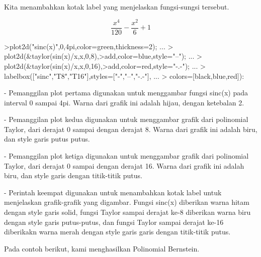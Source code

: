 \documentclass[a4paper,10pt]{article}
\begin{document}
\begin{eulernotebook}
\begin{eulercomment}
\begin{eulercomment}
\begin{eulercomment}
\begin{eulercomment}
\begin{eulercomment}
Kita menambahkan kotak label yang menjelaskan fungsi-sungsi tersebut.
\end{eulercomment}
\begin{eulerformula}
\[
\frac{x^4}{120}-\frac{x^2}{6}+1
\]
\end{eulerformula}
\begin{eulerprompt}
>plot2d("sinc(x)",0,4pi,color=green,thickness=2); ...
>  plot2d(&taylor(sin(x)/x,x,0,8),>add,color=blue,style="--"); ...
>  plot2d(&taylor(sin(x)/x,x,0,16),>add,color=red,style="-.-"); ...
>  labelbox(["sinc","T8","T16"],styles=["-","--","-.-"], ...
>    colors=[black,blue,red]):
\end{eulerprompt}
\begin{eulercomment}
- Pemanggilan plot pertama digunakan untuk menggambar fungsi sinc(x)
pada interval 0 sampai 4pi. Warna dari grafik ini adalah hijau, dengan
ketebalan 2.

- Pemanggilan plot kedua digunakan untuk menggambar grafik dari
polinomial Taylor, dari derajat 0 sampai dengan derajat 8. Warna dari
grafik ini adalah biru, dan style garis putus putus.

- Pemanggilan plot ketiga digunakan untuk menggambar grafik dari
polinomial Taylor, dari derajat 0 sampai dengan derajat 16. Warna dari
grafik ini adalah biru, dan style garis dengan titik-titik putus.

- Perintah keempat digunakan untuk menambahkan kotak label untuk
menjelaskan grafik-grafik yang digambar. Fungsi sinc(x) diberikan
warna hitam dengan style garis solid, fungsi Taylor sampai derajat
ke-8 diberikan warna biru dengan style garis putus-putus, dan fungsi
Taylor sampai derajat ke-16 diberikakn warna merah dengan style garis
garis dengan titik-titik putus.

Pada contoh berikut, kami menghasilkan Polinomial Bernstein.


\end{eulercomment}
\end{eulercomment}
\end{eulercomment}
\end{eulercomment}
\end{eulercomment}
\end{eulernotebook}
\end{document}

